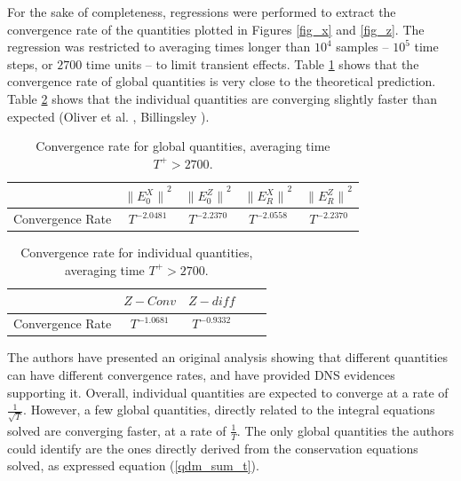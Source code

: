\documentclass[aip,pof,reprint]{revtex4-1}
\begin{document}
For the sake of completeness, regressions were performed to extract the convergence rate of the quantities plotted in Figures \ref{fig_x} and \ref{fig_z}.
The regression was restricted to averaging times longer than $10^4$ samples -- $10^5$ time steps, or $2700$ time units -- to limit transient effects.
Table \ref{tab_conv_rate} shows that the convergence rate of global quantities is very close to the theoretical prediction.
Table \ref{tab_conv_rate_2} shows that the individual quantities are converging slightly faster than expected (Oliver et al. \cite{oliver}, Billingsley \cite{billingsley2008probability}).

\begin{table}
\caption{\label{tab_conv_rate}Convergence rate for global quantities, averaging time $T^+>2700$.}
\begin{ruledtabular}
\begin{tabular}{rcccc}
 & ${\parallel{E_0^X}\parallel}^2$ & ${\parallel{E_0^Z}\parallel}^2$ & ${\parallel{E_R^X}\parallel}^2$ & ${\parallel{E_R^Z}\parallel}^2$ \\
\hline
Convergence Rate & $T^{-2.0481}$ & $T^{-2.2370}$ & $T^{-2.0558}$ & $T^{-2.2370}$ \\
\end{tabular}
\end{ruledtabular}
\end{table}

\begin{table}
\caption{\label{tab_conv_rate_2}Convergence rate for individual quantities, averaging time $T^+>2700$.}
\begin{ruledtabular}
\begin{tabular}{rcccc}
 & $Z-Conv$ & $Z-diff$ \\
\hline
Convergence Rate & $T^{-1.0681}$ & $T^{-0.9332}$ \\
\end{tabular}
\end{ruledtabular}
\end{table}

The authors have presented an original analysis showing that different quantities can have different convergence rates, and have provided DNS evidences supporting it.
Overall, individual quantities are expected to converge at a rate of $\frac{1}{\sqrt{T}}$.
However, a few global quantities, directly related to the integral equations solved are converging faster, at a rate of $\frac{1}{T}$.
The only global quantities the authors could identify are the ones directly derived from the conservation equations solved, as expressed equation (\ref{qdm_sum_t}).
\end{document}
